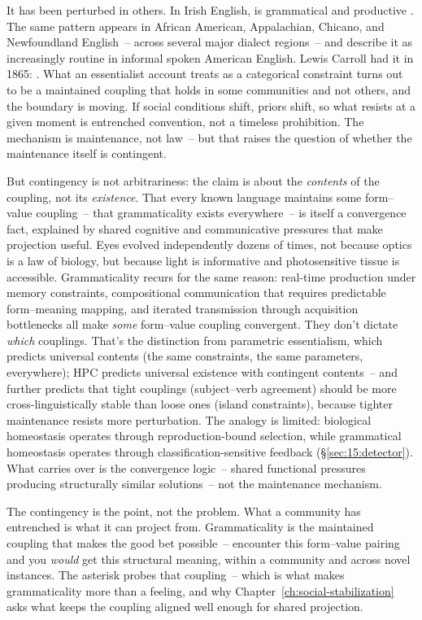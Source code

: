 It has been perturbed in others. In Irish English,  is grammatical and productive \parencite{henry1995belfast}. The same pattern appears in African American, Appalachian, Chicano, and Newfoundland English~-- across several major dialect regions~-- and \textcite{Wolfram2015} describe it as increasingly routine in informal spoken American English. Lewis Carroll had it in 1865: . What an essentialist account treats as a categorical constraint turns out to be a maintained coupling that holds in some communities and not others, and the boundary is moving. If social conditions shift, priors shift, so what resists at a given moment is entrenched convention, not a timeless prohibition. The mechanism is maintenance, not law~-- but that raises the question of whether the maintenance itself is contingent.

But contingency is not arbitrariness: the claim is about the \emph{contents} of the coupling, not its \emph{existence}. That every known language maintains some form--value coupling~-- that grammaticality exists everywhere~-- is itself a convergence fact, explained by shared cognitive and communicative pressures that make projection useful. Eyes evolved independently dozens of times, not because optics is a law of biology, but because light is informative and photosensitive tissue is accessible. Grammaticality recurs for the same reason: real-time production under memory constraints, compositional communication that requires predictable form--meaning mapping, and iterated transmission through acquisition bottlenecks all make \emph{some} form--value coupling convergent. They don't dictate \emph{which} couplings. That's the distinction from parametric essentialism, which predicts universal contents (the same constraints, the same parameters, everywhere); HPC predicts universal existence with contingent contents~-- and further predicts that tight couplings (subject--verb agreement) should be more cross-linguistically stable than loose ones (island constraints), because tighter maintenance resists more perturbation. The analogy is limited: biological homeostasis operates through reproduction-bound selection, while grammatical homeostasis operates through classification-sensitive feedback (§\ref{sec:15:detector}). What carries over is the convergence logic~-- shared functional pressures producing structurally similar solutions~-- not the maintenance mechanism.

The contingency is the point, not the problem. What a community has entrenched is what it can project from. Grammaticality is the maintained coupling that makes the good bet possible~-- encounter this form--value pairing and you \emph{would} get this structural meaning, within a community and across novel instances. The asterisk probes that coupling~-- which is what makes grammaticality more than a feeling, and why Chapter~\ref{ch:social-stabilization} asks what keeps the coupling aligned well enough for shared projection.
